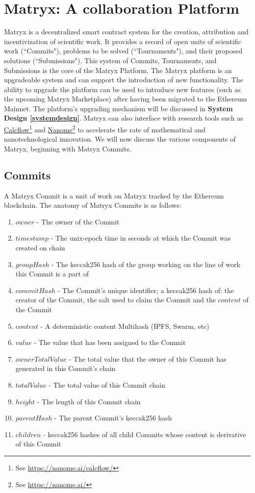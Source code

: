 \documentclass[a4paper, 10pt, conference]{ieeeconf}      %
\begin{document}
\section{Matryx: A collaboration Platform}
\label{matryx::acollaborationPlatform}
Matryx is a decentralized smart contract system for the creation, attribution and incentivization of scientific work. It provides a record of open units of scientific work (``Commits"), problems to be solved (``Tournaments"), and their proposed solutions (``Submissions"). This system of Commits, Tournaments, and Submissions is the core of the Matryx Platform. The Matryx platform is an upgradeable system and can support the introduction of new functionality. The ability to upgrade the platform can be used to introduce new features (such as the upcoming Matryx Marketplace) after having been migrated to the Ethereum Mainnet. The platform's upgrading mechanism will be discussed in \textbf{System Design \ref{systemdesign}}. Matryx can also interface with research tools such as \href{https://nanome.ai/calcflow/}{Calcflow}\footnote{See \href{https://nanome.ai/calcflow/}{https://nanome.ai/calcflow/}} and \href{https://nanome.ai/}{Nanome}\footnote{See \href{https://nanome.ai/}{https://nanome.ai/}} to accelerate the rate of mathematical and nanotechnological innovation. We will now discuss the various components of Matryx, beginning with Matryx Commits.

\subsection{Commits}\label{Commits}

A Matryx Commit is a unit of work on Matryx tracked by the Ethereum blockchain. The anatomy of Matryx Commits is as follows:

\begin{enumerate}
\item $owner$ - The owner of the Commit
\item $timestamp$ - The unix-epoch time in seconds at which the Commit was created on chain
\item $groupHash$ - The keccak256 hash of the group working on the line of work this Commit is a part of
\item $commitHash$ - The Commit's unique identifier; a keccak256 hash of: the creator of the Commit, the salt used to claim the Commit and the $content$ of the Commit
\item $content$ - A deterministic content Multihash (IPFS, Swarm, etc)
\item $value$ - The value that has been assigned to the Commit
\item $ownerTotalValue$ - The total value that the owner of this Commit has generated in this Commit's chain
\item $totalValue$ - The total value of this Commit chain
\item $height$ - The length of this Commit chain
\item $parentHash$ - The parent Commit's keccak256 hash
\item $children$ - keccak256 hashes of all child Commits whose content is derivative of this Commit
\end{enumerate}
\bigskip
\end{document}
